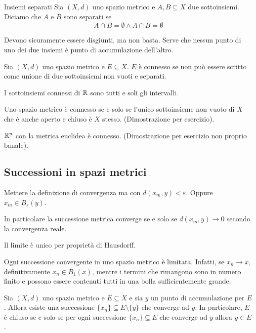 \documentclass[a4paper]{article}
\begin{document}
\begin{snippetdefinition}{Insiemi separati}
    Sia \((X, d)\) uno spazio metrico e \(A,B\subseteq X\) due sottoinsiemi.
    Diciamo che \(A\) e \(B\) sono separati se
    \[
        A \cap \overline{B} = \emptyset \land \overline{A} \cap B = \emptyset
    \]
\end{snippetdefinition}

Devono sicuramente essere disgiunti, ma non basta.
Serve che nessun punto di uno dei due insiemi è punto di accumulazione
dell'altro.

\begin{snippetdefinition}{}
    Sia \((X, d)\) uno spazio metrico e \(E\subseteq X\). \(E\) è connesso
    se non può essere scritto come unione di due sottoinsiemi non vuoti e separati.
\end{snippetdefinition}

I sottoinsiemi connessi di \(\mathbb{R}\) sono tutti e soli gli intervalli.

Uno spazio metrico è connesso se e solo se l'unico sottoinsieme non vuoto
di \(X\) che è anche aperto e chiuso è \(X\) stesso. (Dimostrazione per esercizio).

\(\mathbb{R}^n\) con la metrica euclidea è connesso. (Dimostrazione per esercizio non proprio banale).

\subsection{Successioni in spazi metrici}

Mettere la definizione di convergenza ma con \(d(x_m,y) < \varepsilon\).
Oppure \(x_m \in B_\varepsilon(y)\).

In particolare la successione metrica converge se e solo se \(d(x_m, y) \to 0\)
secondo la convergenza reale.

Il limite è unico per proprietà di Hausdorff.

Ogni successione convergente in uno spazio metrico è limitata.
Infatti, se \(x_n\to x\), definitivamente \(x_n\in B_1(x)\), mentre i termini che rimangono
sono in numero finito e possono essere contenuti tutti in una bolla sufficientemente grande.

\begin{snippetproposition}{}
    Sia \((X,d)\) uno spazio metrico e \(E \subseteq X\) e sia \(y\) un punto di accumulazione
    per \(E\). Allora esiste una successione \(\{x_n\} \subseteq E \setminus \{y\}\)
    che converge ad \(y\).
    In particolare, \(E\) è chiuso se e solo se per ogni successione \(\{x_n\} \subseteq E\)
    che converge ad \(y\) allora \(y \in E\).
\end{snippetproposition}
\end{document}
